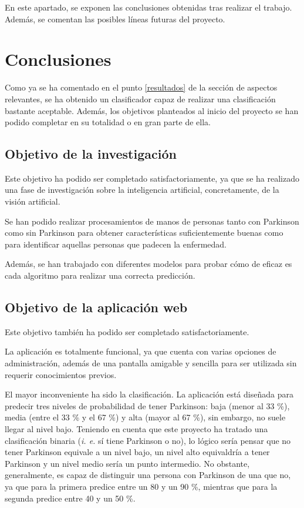  En este apartado, se exponen las conclusiones obtenidas tras realizar el trabajo. Además, se comentan las posibles líneas futuras del proyecto.
 
 \section{Conclusiones}
 Como ya se ha comentado en el punto \ref{resultados} de la sección de aspectos relevantes, se ha obtenido un clasificador capaz de realizar una clasificación bastante aceptable. Además, los objetivos planteados al inicio del proyecto se han podido completar en su totalidad o en gran parte de ella.
 
 \subsection{Objetivo de la investigación}
 Este objetivo ha podido ser completado satisfactoriamente, ya que se ha realizado una fase de investigación sobre la inteligencia artificial, concretamente, de la visión artificial.
 
 Se han podido realizar procesamientos de manos de personas tanto con Parkinson como sin Parkinson para obtener características suficientemente buenas como para identificar aquellas personas que padecen la enfermedad.
 
 Además, se han trabajado con diferentes modelos para probar cómo de eficaz es cada algoritmo para realizar una correcta predicción.
 
 \subsection{Objetivo de la aplicación web}
 Este objetivo también ha podido ser completado satisfactoriamente.
 
 La aplicación es totalmente funcional, ya que cuenta con varias opciones de administración, además de una pantalla amigable y sencilla para ser utilizada sin requerir conocimientos previos.
 
 El mayor inconveniente ha sido la clasificación. La aplicación está diseñada para predecir tres niveles de probabilidad de tener Parkinson: baja (menor al 33 \%), media (entre el 33 \% y el 67 \%) y alta (mayor al 67 \%), sin embargo, no suele llegar al nivel bajo. Teniendo en cuenta que este proyecto ha tratado una clasificación binaria (\textit{i. e.} sí tiene Parkinson o no), lo lógico sería pensar que no tener Parkinson equivale a un nivel bajo, un nivel alto equivaldría a tener Parkinson y un nivel medio sería un punto intermedio. No obstante, generalmente, es capaz de distinguir una persona con Parkinson de una que no, ya que para la primera predice entre un 80 y un 90 \%, mientras que para la segunda predice entre 40 y un 50 \%.
 
